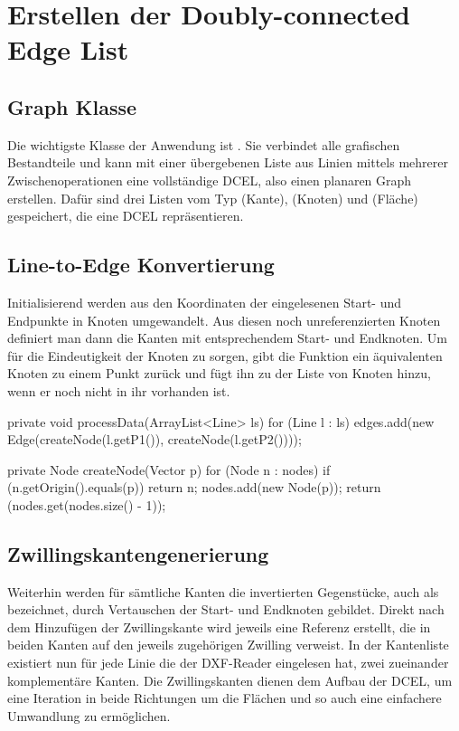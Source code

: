 \section{Erstellen der Doubly-connected Edge List}
\subsection{Graph Klasse}
Die wichtigste Klasse der Anwendung ist . 
Sie verbindet alle grafischen Bestandteile und kann mit einer übergebenen Liste aus Linien mittels mehrerer Zwischenoperationen eine vollständige DCEL, also einen planaren Graph erstellen.
Dafür sind drei Listen vom Typ (Kante), (Knoten) und (Fläche) gespeichert, die eine DCEL repräsentieren.

\subsection{Line-to-Edge Konvertierung}
\label{subsec:ltoe} 
Initialisierend werden aus den Koordinaten der eingelesenen Start- und Endpunkte in Knoten umgewandelt.
Aus diesen noch unreferenzierten Knoten definiert man dann die Kanten mit entsprechendem Start- und Endknoten.
Um für die Eindeutigkeit der Knoten zu sorgen, gibt die Funktion  ein äquivalenten Knoten zu einem Punkt zurück und fügt ihn zu der Liste von Knoten hinzu, wenn er noch nicht in ihr vorhanden ist.

\begin{code}
private void processData(ArrayList<Line> ls) {
	for (Line l : ls) {
		edges.add(new Edge(createNode(l.getP1()), createNode(l.getP2())));
	}
}
\end{code}

\begin{code}
private Node createNode(Vector p) {
	for (Node n : nodes) {
		if (n.getOrigin().equals(p)) {
			return n;
		}
	}
	nodes.add(new Node(p));
	return (nodes.get(nodes.size() - 1));
}
\end{code}


\subsection{Zwillingskantengenerierung}
Weiterhin werden für sämtliche Kanten die invertierten Gegenstücke, auch als  bezeichnet, durch Vertauschen der Start- und Endknoten gebildet.
Direkt nach dem Hinzufügen der Zwillingskante wird jeweils eine Referenz erstellt, die in beiden Kanten auf den jeweils zugehörigen Zwilling verweist. 
In der Kantenliste existiert nun für jede Linie die der DXF-Reader eingelesen hat, zwei zueinander komplementäre Kanten.
Die Zwillingskanten dienen dem Aufbau der DCEL, um eine Iteration in beide Richtungen um die Flächen und so auch eine einfachere Umwandlung zu ermöglichen.

